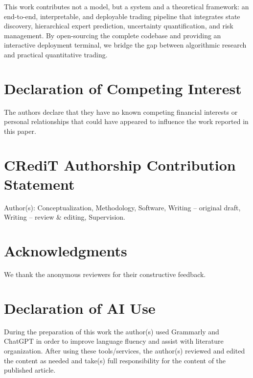 \documentclass[review]{elsarticle}
\begin{document}
This work contributes not a model, but a system and a theoretical framework: an end-to-end, interpretable, and deployable trading pipeline that integrates state discovery, hierarchical expert prediction, uncertainty quantification, and risk management. By open-sourcing the complete codebase and providing an interactive deployment terminal, we bridge the gap between algorithmic research and practical quantitative trading.

\section*{Declaration of Competing Interest}

The authors declare that they have no known competing financial interests or personal relationships that could have appeared to influence the work reported in this paper.

\section*{CRediT Authorship Contribution Statement}

Author(s): Conceptualization, Methodology, Software, Writing -- original draft, Writing -- review \& editing, Supervision.

\section*{Acknowledgments}

We thank the anonymous reviewers for their constructive feedback.

\section*{Declaration of AI Use}

During the preparation of this work the author(s) used Grammarly and ChatGPT in order to improve language fluency and assist with literature organization. After using these tools/services, the author(s) reviewed and edited the content as needed and take(s) full responsibility for the content of the published article.


\end{document}
